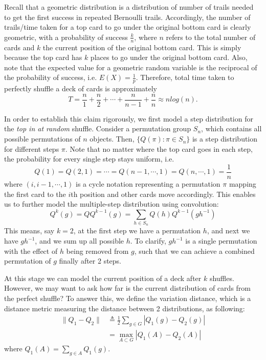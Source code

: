 \documentclass[12pt]{article}
\theoremstyle{plain}
\theoremstyle{definition}
\theoremstyle{remark}
\begin{document}
Recall that a geometric distribution is a distribution of number of trails needed to get the first success in repeated Bernoulli trails. Accordingly, the number of trails/time taken for a top card to go under the original bottom card is clearly geometric, with a probability of success $\frac{k}{n}$, where $n$ refers to the total number of cards and $k$ the current position of the original bottom card. This is simply because the top card has $k$ places to go under the original bottom card. Also, note that the expected value for a geometric random variable is the reciprocal of the probability of success, i.e. $E(X)=\frac{1}{p}$. Therefore, total time taken to perfectly shuffle a deck of cards is approximately $$T = \frac{n}{1} + \frac{n}{2} + \cdots + \frac{n}{n-1} + \frac{n}{n} \approx nlog(n).$$

In order to establish this claim rigorously, we first model a step distribution for the \textit{top in at random} shuffle. Consider a permutation group $S_n$, which contains all possible permutations of $n$ objects. Then, $\{Q(\pi):\pi \in S_n\}$ is a step distribution for different steps $\pi$. Note that no matter where the top card goes in each step, the probability for every single step stays uniform, i.e.  $$Q(1)=Q(2,1)=\cdots=Q(n-1,\cdots,1)=Q(n,\cdots,1)=\frac{1}{n}$$ where $(i,i-1,\cdots,1)$ is a cycle notation representing a permutation $\pi$ mapping the first card to the $i$th position and other cards move accordingly. This enables us to further model the multiple-step distribution using convolution\cite[\pno~334]{1.1}: $$Q^k(g)=QQ^{k-1}(g)=\sum_{h\in S_n}Q(h)Q^{k-1}(gh^{-1})$$
This means, say $k=2$, at the first step we have a permutation $h$, and next we have $gh^{-1}$, and we sum up all possible $h$. To clarify, $gh^{-1}$ is a single permutation with the effect of $h$ being removed from $g$, such that we can achieve a combined permutation of $g$ finally after 2 steps.

At this stage we can model the current position of a deck after $k$ shuffles. However, we may want to ask how far is the current distribution of cards from the perfect shuffle? To answer this, we define the variation distance, which is a distance metric measuring the distance between 2 distributions, as following\cite[\pno~335]{1.1}:
\begin{equation*}
\begin{split}
    \|Q_1-Q_2\|&\triangleq \frac{1}{2}\sum_{g\in G}|Q_1(g)-Q_2(g)|\\
    &=\max_{A\subset G}|Q_1(A)-Q_2(A)|
\end{split}
\end{equation*}
where $Q_1(A)=\sum_{g\in A}Q_1(g)$.
\end{document}
